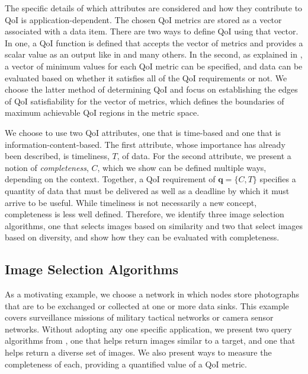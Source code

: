 The specific details of which attributes are considered and how they contribute to QoI is application-dependent.  The chosen QoI metrics are stored as a vector associated with a data item.  There are two ways to define QoI using that vector.  In one, a QoI function is defined that accepts the vector of metrics and provides a scalar value as an output like in  \cite{qoi_aware_mobile_apps,qoi_aware_trx_pol_time_vary_links} and many others.  In the second, as explained in \cite{qoi_aware_tactical_mil_nets}, a vector of minimum values for each QoI metric can be specified, and data can be evaluated based on whether it satisfies all of the QoI requirements or not.  We choose the latter method of determining QoI and focus on establishing the edges of QoI satisfiability for the vector of metrics, which defines the boundaries of maximum achievable QoI regions in the metric space.

We choose to use two QoI attributes, one that is time-based and one that is information-content-based.  The first attribute, whose importance has already been described, is timeliness, $T$, of data.  For the second attribute, we present a notion of \emph{completeness}, $C$, which we show can be defined multiple ways, depending on the context.  Together, a QoI requirement of $\mathbf{q} = \{C,T\}$ specifies a quantity of data that must be delivered as well as a deadline by which it must arrive to be useful.  While timeliness is not necessarily a new concept, completeness is less well defined.  Therefore, we identify three image selection algorithms, one that selects images based on similarity and two that select images based on diversity, and show how they can be evaluated with completeness.

\subsection{Image Selection Algorithms}

As a motivating example, we choose a network in which nodes store photographs that are to be exchanged or collected at one or more data sinks.  This example covers surveillance missions of military tactical networks or camera sensor networks.  Without adopting any one specific application, we present two query algorithms from \cite{mediascope}, one that helps return images similar to a target, and one that helps return a diverse set of images.  We also present ways to measure the completeness of each, providing a quantified value of a QoI metric.

